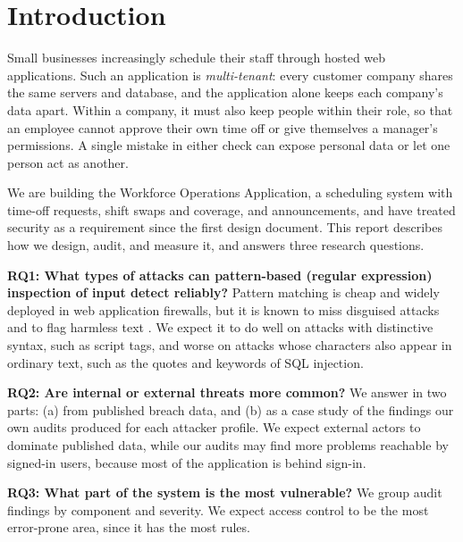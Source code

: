 \section{Introduction}

Small businesses increasingly schedule their staff through hosted web applications. Such an application is \emph{multi-tenant}: every customer company shares the same servers and database, and the application alone keeps each company's data apart. Within a company, it must also keep people within their role, so that an employee cannot approve their own time off or give themselves a manager's permissions. A single mistake in either check can expose personal data or let one person act as another.

We are building the Workforce Operations Application, a scheduling system with time-off requests, shift swaps and coverage, and announcements, and have treated security as a requirement since the first design document. This report describes how we design, audit, and measure it, and answers three research questions. 

\textbf{RQ1: What types of attacks can pattern-based (regular expression) inspection of input detect reliably?} Pattern matching is cheap and widely deployed in web application firewalls, but it is known to miss disguised attacks and to flag harmless text . We expect it to do well on attacks with distinctive syntax, such as script tags, and worse on attacks whose characters also appear in ordinary text, such as the quotes and keywords of SQL injection.

\textbf{RQ2: Are internal or external threats more common?} We answer in two parts: (a) from published breach data, and (b) as a case study of the findings our own audits produced for each attacker profile. We expect external actors to dominate published data, while our audits may find more problems reachable by signed-in users, because most of the application is behind sign-in.

\textbf{RQ3: What part of the system is the most vulnerable?} We group audit findings by component and severity. We expect access control to be the most error-prone area, since it has the most rules.

